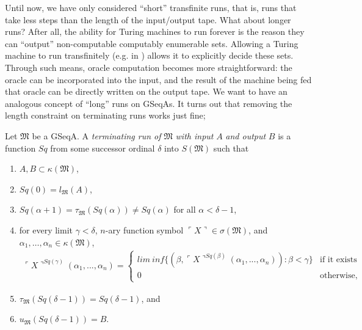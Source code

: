 \documentclass[12pt]{article}
\numberwithin{equation}{section}
\begin{document}
Until now, we have only considered ``short'' transfinite runs, that is, runs that take less steps than the length of the input/output tape. What about longer runs? After all, the ability for Turing machines to run forever is the reason they can ``output'' non-computable computably enumerable sets. Allowing a Turing machine to run transfinitely (e.g. in \cite{ittm}) allows it to explicitly decide these sets. Through such means, oracle computation becomes more straightforward: the oracle can be incorporated into the input, and the result of the machine being fed that oracle can be directly written on the output tape. We want to have an analogous concept of ``long'' runs on GSeqAs. It turns out that removing the length constraint on terminating runs works just fine; 

\begin{defi}\label{def242}
Let $\mathfrak{M}$ be a GSeqA. A \emph{terminating run of} $\mathfrak{M}$ \emph{with input} $A$ \emph{and output} $B$ is a function $Sq$ from some successor ordinal $\delta$ into $S(\mathfrak{M})$ such that 
\begin{enumerate}[label=(\alph*)]
    \item $A, B \subset \kappa(\mathfrak{M})$,
    \item $Sq(0) = l_{\mathfrak{M}}(A)$,
    \item $Sq(\alpha + 1) = \tau_{\mathfrak{M}}(Sq(\alpha)) \neq Sq(\alpha)$ for all $\alpha < \delta - 1$,
    \item for every limit $\gamma < \delta$, $n$-ary function symbol $\ulcorner X \urcorner \in \sigma(\mathfrak{M})$, and $\alpha_1, \dots, \alpha_n \in \kappa(\mathfrak{M})$,
    \begin{gather*}
        \ulcorner X \urcorner^{Sq(\gamma)} (\alpha_1, ..., \alpha_n) \! = \! 
        \begin{cases}
            lim \ inf \{(\beta, \ulcorner X \urcorner^{Sq(\beta)}(\alpha_1, ..., \alpha_n)) \! : \! \beta < \gamma\} & \!\!\!\! \text{if it exists} \\
            0 & \!\!\!\! \text{otherwise,}
        \end{cases} 
    \end{gather*}
    \item $\tau_{\mathfrak{M}}(Sq(\delta - 1)) = Sq(\delta - 1)$, and
    \item $u_{\mathfrak{M}}(Sq(\delta - 1)) = B$.
\end{enumerate}
\end{defi}
\end{document}
